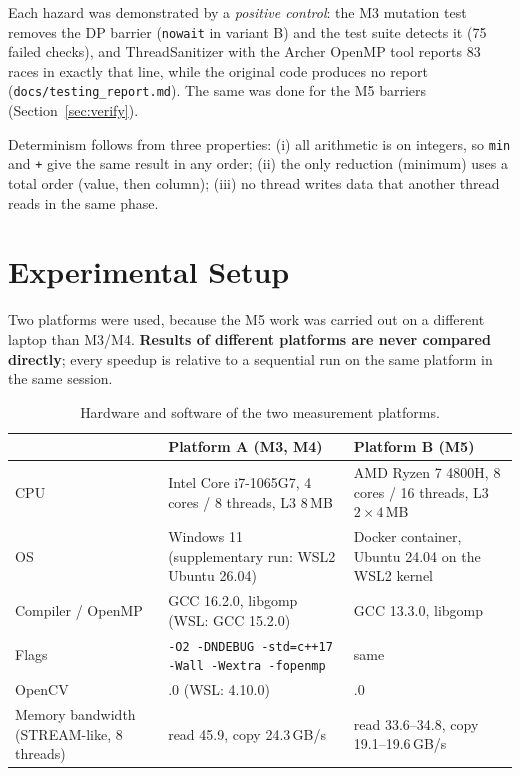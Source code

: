 \documentclass[11pt,a4paper]{article}
\begin{document}
Each hazard was demonstrated by a \emph{positive control}: the M3 mutation test removes the DP barrier
(\texttt{nowait} in variant B) and the test suite detects it (75 failed checks), and ThreadSanitizer with
the Archer OpenMP tool reports 83 races in exactly that line, while the original code produces no report
(\texttt{docs/testing\_report.md}). The same was done for the M5 barriers (Section~\ref{sec:verify}).

Determinism follows from three properties: (i) all arithmetic is on integers, so \texttt{min} and
\texttt{+} give the same result in any order; (ii) the only reduction (minimum) uses a total order (value,
then column); (iii) no thread writes data that another thread reads in the same phase.

\section{Experimental Setup}

Two platforms were used, because the M5 work was carried out on a different laptop than M3/M4.
\textbf{Results of different platforms are never compared directly}; every speedup is relative to a
sequential run on the same platform in the same session.

\begin{table}[ht]
\centering\small
\begin{tabularx}{\textwidth}{@{}>{\raggedright\arraybackslash}p{3.2cm}>{\raggedright\arraybackslash}X>{\raggedright\arraybackslash}X@{}}
\toprule
 & Platform A (M3, M4) & Platform B (M5) \\
\midrule
CPU & Intel Core i7-1065G7, 4 cores / 8 threads, L3 8\,MB & AMD Ryzen 7 4800H, 8 cores / 16 threads, L3 $2\times4$\,MB \\
OS & Windows 11 (supplementary run: WSL2 Ubuntu 26.04) & Docker container, Ubuntu 24.04 on the WSL2 kernel \\
Compiler / OpenMP & GCC 16.2.0, libgomp (WSL: GCC 15.2.0) & GCC 13.3.0, libgomp \\
Flags & \texttt{-O2 -DNDEBUG -std=c++17 -Wall -Wextra -fopenmp} & same \\
OpenCV & 5.0.0 (WSL: 4.10.0) & 4.6.0 \\
Memory bandwidth (STREAM-like, 8 threads) & read 45.9, copy 24.3\,GB/s & read 33.6--34.8, copy 19.1--19.6\,GB/s \\
\bottomrule
\end{tabularx}
\caption{Hardware and software of the two measurement platforms.}
\end{table}
\end{document}
